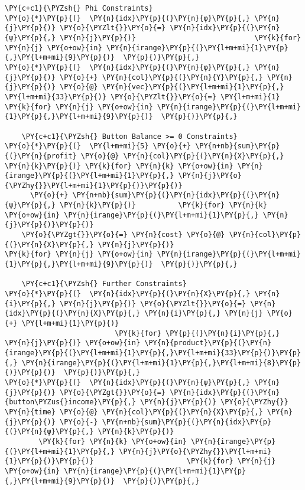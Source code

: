 \begin{tcolorbox}[breakable, size=fbox, boxrule=1pt, pad at break*=1mm,colback=cellbackground, colframe=cellborder]
\begin{Verbatim}[commandchars=\\\{\}]
    \PY{c+c1}{\PYZsh{} Phi Constraints}
\PY{o}{*}\PY{p}{(}  \PY{n}{idx}\PY{p}{(}\PY{n}{φ}\PY{p}{,} \PY{n}{j}\PY{p}{)} \PY{o}{\PYZlt{}}\PY{o}{=} \PY{n}{idx}\PY{p}{(}\PY{n}{ψ}\PY{p}{,} \PY{n}{j}\PY{p}{)}                            \PY{k}{for} \PY{n}{j} \PY{o+ow}{in} \PY{n}{irange}\PY{p}{(}\PY{l+m+mi}{1}\PY{p}{,}\PY{l+m+mi}{9}\PY{p}{)}  \PY{p}{)}\PY{p}{,}
\PY{o}{*}\PY{p}{(}  \PY{n}{idx}\PY{p}{(}\PY{n}{φ}\PY{p}{,} \PY{n}{j}\PY{p}{)} \PY{o}{+} \PY{n}{col}\PY{p}{(}\PY{n}{Y}\PY{p}{,} \PY{n}{j}\PY{p}{)} \PY{o}{@} \PY{n}{vec}\PY{p}{(}\PY{l+m+mi}{1}\PY{p}{,} \PY{l+m+mi}{33}\PY{p}{)} \PY{o}{\PYZlt{}}\PY{o}{=} \PY{l+m+mi}{1}           \PY{k}{for} \PY{n}{j} \PY{o+ow}{in} \PY{n}{irange}\PY{p}{(}\PY{l+m+mi}{1}\PY{p}{,}\PY{l+m+mi}{9}\PY{p}{)}  \PY{p}{)}\PY{p}{,}

    \PY{c+c1}{\PYZsh{} Button Balance >= 0 Constraints}
\PY{o}{*}\PY{p}{(}  \PY{l+m+mi}{5} \PY{o}{+} \PY{n+nb}{sum}\PY{p}{(}\PY{n}{profit} \PY{o}{@} \PY{n}{col}\PY{p}{(}\PY{n}{X}\PY{p}{,} \PY{n}{k}\PY{p}{)} \PY{k}{for} \PY{n}{k} \PY{o+ow}{in} \PY{n}{irange}\PY{p}{(}\PY{l+m+mi}{1}\PY{p}{,} \PY{n}{j}\PY{o}{\PYZhy{}}\PY{l+m+mi}{1}\PY{p}{)}\PY{p}{)}
      \PY{o}{+} \PY{n+nb}{sum}\PY{p}{(}\PY{n}{idx}\PY{p}{(}\PY{n}{ψ}\PY{p}{,} \PY{n}{k}\PY{p}{)}          \PY{k}{for} \PY{n}{k} \PY{o+ow}{in} \PY{n}{irange}\PY{p}{(}\PY{l+m+mi}{1}\PY{p}{,} \PY{n}{j}\PY{p}{)}\PY{p}{)}
    \PY{o}{\PYZgt{}}\PY{o}{=} \PY{n}{cost} \PY{o}{@} \PY{n}{col}\PY{p}{(}\PY{n}{X}\PY{p}{,} \PY{n}{j}\PY{p}{)}                               \PY{k}{for} \PY{n}{j} \PY{o+ow}{in} \PY{n}{irange}\PY{p}{(}\PY{l+m+mi}{1}\PY{p}{,}\PY{l+m+mi}{9}\PY{p}{)}  \PY{p}{)}\PY{p}{,}

    \PY{c+c1}{\PYZsh{} Further Constraints}
\PY{o}{*}\PY{p}{(}  \PY{n}{idx}\PY{p}{(}\PY{n}{X}\PY{p}{,} \PY{n}{i}\PY{p}{,} \PY{n}{j}\PY{p}{)} \PY{o}{\PYZlt{}}\PY{o}{=} \PY{n}{idx}\PY{p}{(}\PY{n}{X}\PY{p}{,} \PY{n}{i}\PY{p}{,} \PY{n}{j} \PY{o}{+} \PY{l+m+mi}{1}\PY{p}{)}
                          \PY{k}{for} \PY{p}{(}\PY{n}{i}\PY{p}{,} \PY{n}{j}\PY{p}{)} \PY{o+ow}{in} \PY{n}{product}\PY{p}{(}\PY{n}{irange}\PY{p}{(}\PY{l+m+mi}{1}\PY{p}{,}\PY{l+m+mi}{33}\PY{p}{)}\PY{p}{,} \PY{n}{irange}\PY{p}{(}\PY{l+m+mi}{1}\PY{p}{,}\PY{l+m+mi}{8}\PY{p}{)}\PY{p}{)}  \PY{p}{)}\PY{p}{,}
\PY{o}{*}\PY{p}{(}  \PY{n}{idx}\PY{p}{(}\PY{n}{ψ}\PY{p}{,} \PY{n}{j}\PY{p}{)} \PY{o}{\PYZgt{}}\PY{o}{=} \PY{n}{idx}\PY{p}{(}\PY{n}{button\PYZus{}income}\PY{p}{,} \PY{n}{j}\PY{p}{)} \PY{o}{\PYZhy{}} \PY{n}{time} \PY{o}{@} \PY{n}{col}\PY{p}{(}\PY{n}{X}\PY{p}{,} \PY{n}{j}\PY{p}{)} \PY{o}{-} \PY{n+nb}{sum}\PY{p}{(}\PY{n}{idx}\PY{p}{(}\PY{n}{ψ}\PY{p}{,} \PY{n}{k}\PY{p}{)}
        \PY{k}{for} \PY{n}{k} \PY{o+ow}{in} \PY{n}{irange}\PY{p}{(}\PY{l+m+mi}{1}\PY{p}{,} \PY{n}{j}\PY{o}{\PYZhy{}}\PY{l+m+mi}{1}\PY{p}{)}\PY{p}{)}                      \PY{k}{for} \PY{n}{j} \PY{o+ow}{in} \PY{n}{irange}\PY{p}{(}\PY{l+m+mi}{1}\PY{p}{,}\PY{l+m+mi}{9}\PY{p}{)}  \PY{p}{)}\PY{p}{,}


\end{Verbatim}
\end{tcolorbox}
